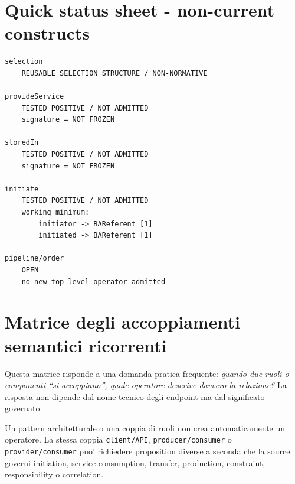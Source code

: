 \documentclass[11pt,a4paper]{article}
\begin{document}
\section{Quick status sheet - non-current constructs}
\begin{lstlisting}
selection
    REUSABLE_SELECTION_STRUCTURE / NON-NORMATIVE

provideService
    TESTED_POSITIVE / NOT_ADMITTED
    signature = NOT FROZEN

storedIn
    TESTED_POSITIVE / NOT_ADMITTED
    signature = NOT FROZEN

initiate
    TESTED_POSITIVE / NOT_ADMITTED
    working minimum:
        initiator -> BAReferent [1]
        initiated -> BAReferent [1]

pipeline/order
    OPEN
    no new top-level operator admitted
\end{lstlisting}


\clearpage
\section{Matrice degli accoppiamenti semantici ricorrenti}

Questa matrice risponde a una domanda pratica frequente: \emph{quando due ruoli o componenti ``si accoppiano'', quale operatore descrive davvero la relazione?} La risposta non dipende dal nome tecnico degli endpoint ma dal significato governato.

\begin{ddtacore}[title={Regola fondamentale}]
Un pattern architetturale o una coppia di ruoli non crea automaticamente un operatore. La stessa coppia \texttt{client/API}, \texttt{producer/consumer} o \texttt{provider/consumer} puo' richiedere proposition diverse a seconda che la source governi initiation, service consumption, transfer, production, constraint, responsibility o correlation.
\end{ddtacore}
\end{document}
